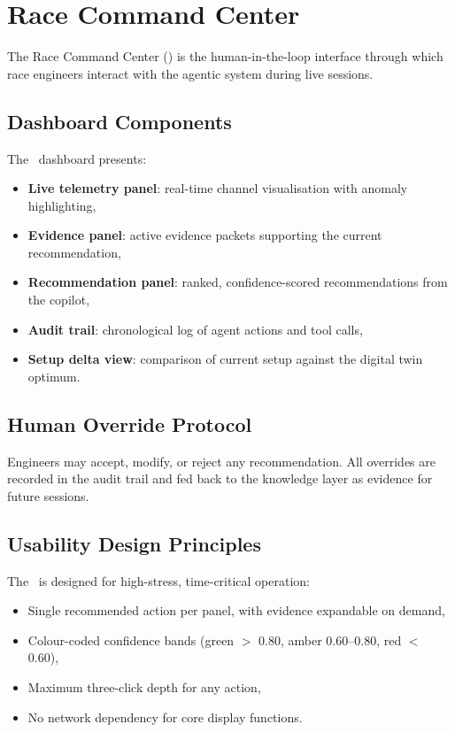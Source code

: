 \section{Race Command Center}
\label{sec:race-command-center}

The Race Command Center (\rcc) is the human-in-the-loop interface through which
race engineers interact with the agentic system during live sessions.

\subsection{Dashboard Components}

The \rcc~dashboard presents:

\begin{itemize}
  \item \textbf{Live telemetry panel}: real-time channel visualisation with
    anomaly highlighting,
  \item \textbf{Evidence panel}: active evidence packets supporting the current
    recommendation,
  \item \textbf{Recommendation panel}: ranked, confidence-scored recommendations
    from the copilot,
  \item \textbf{Audit trail}: chronological log of agent actions and tool calls,
  \item \textbf{Setup delta view}: comparison of current setup against the
    digital twin optimum.
\end{itemize}

\subsection{Human Override Protocol}

Engineers may accept, modify, or reject any recommendation. All overrides are
recorded in the audit trail and fed back to the knowledge layer as evidence for
future sessions.

\subsection{Usability Design Principles}

The \rcc~is designed for high-stress, time-critical operation:

\begin{itemize}
  \item Single recommended action per panel, with evidence expandable on demand,
  \item Colour-coded confidence bands (green $>$ 0.80, amber 0.60--0.80,
    red $<$ 0.60),
  \item Maximum three-click depth for any action,
  \item No network dependency for core display functions.
\end{itemize}
